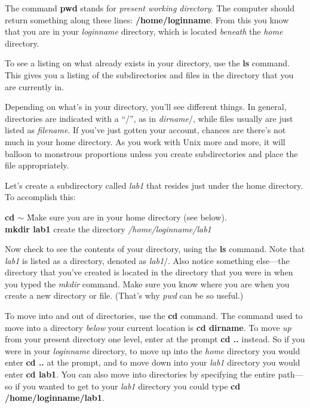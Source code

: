 
\noindent The command {\bf pwd} stands for {\it present working
directory}.  The computer should return something along these lines:
{\bf /home/loginname}.  From this you know that you are in your {\it
loginname} directory, which is located {\it beneath} the {\it home}
directory. 

	To see a listing on what already exists in your directory, use
the {\bf ls} command.  This gives you a listing of the subdirectories
and files in the directory that you are currently in. 


\noindent Depending on what's in your directory, you'll see different
things.  In general, directories are indicated with a ``/'', as in {\it
dirname}/, while files usually are just listed as {\it filename}.  If
you've just gotten your account, chances are there's not much in your
home directory.  As you work with Unix more and more, it will balloon to
monstrous proportions unless you create subdirectories and place the
file appropriately. 

	Let's create a subdirectory called {\it lab1} that resides just
under the home directory. To accomplish this:

\begin{tabbing}
\textbf{cd $\sim$} \hspace{1in} \= Make sure you are in your home
directory (see below). \\
\textbf{mkdir lab1} \> create the directory {\em /home/loginname/lab1}
\\
\end{tabbing}

\noindent Now check to see the contents of your directory, using the
{\bf ls} command.  Note that {\it lab1} is listed as a directory,
denoted as {\it lab1}/.  Also notice something else---the directory that
you've created is located in the directory that you were in when you
typed the {\it mkdir} command.  Make sure you know where you are when
you create a new directory or file.  (That's why {\it pwd} can be so
useful.)

	To move into and out of directories, use the {\bf cd} command. 
The command used to move into a directory {\it below} your current
location is {\bf cd dirname}.  To move {\it up} from your present
directory one level, enter at the prompt {\bf cd ..} instead.  So if you
were in your {\it loginname} directory, to move up into the {\it home}
directory you would enter {\bf cd ..} at the prompt, and to move down
into your {\it lab1} directory you would enter {\bf cd lab1}.  You can
also move into directories by specifying the entire path---so if you
wanted to get to your {\it lab1} directory you could type {\bf cd
/home/loginname/lab1}. 

